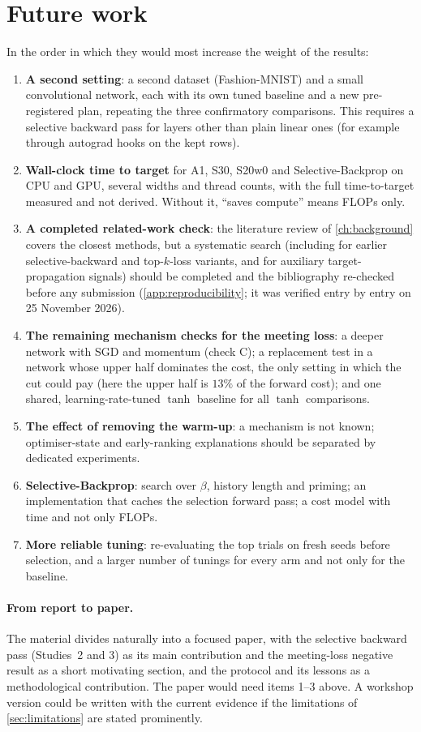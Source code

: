 \section{Future work}\label{sec:future}
In the order in which they would most increase the weight of the results:
\begin{enumerate}
\item \textbf{A second setting}: a second dataset (Fashion-MNIST) and a small convolutional network, each with its own tuned baseline and a new pre-registered plan, repeating the three confirmatory comparisons. This requires a selective backward pass for layers other than plain linear ones (for example through autograd hooks on the kept rows).
\item \textbf{Wall-clock time to target} for A1, S30, S20w0 and Selective-Backprop on CPU and GPU, several widths and thread counts, with the full time-to-target measured and not derived. Without it, ``saves compute'' means FLOPs only.
\item \textbf{A completed related-work check}: the literature review of \cref{ch:background} covers the closest methods, but a systematic search (including for earlier selective-backward and top-$k$-loss variants, and for auxiliary target-propagation signals) should be completed and the bibliography re-checked before any submission (\cref{app:reproducibility}; it was verified entry by entry on 25 November 2026).
\item \textbf{The remaining mechanism checks for the meeting loss}: a deeper network with SGD and momentum (check C); a replacement test in a network whose upper half dominates the cost, the only setting in which the cut could pay (here the upper half is $13\%$ of the forward cost); and one shared, learning-rate-tuned $\tanh$ baseline for all $\tanh$ comparisons.
\item \textbf{The effect of removing the warm-up}: a mechanism is not known; optimiser-state and early-ranking explanations should be separated by dedicated experiments.
\item \textbf{Selective-Backprop}: search over $\beta$, history length and priming; an implementation that caches the selection forward pass; a cost model with time and not only FLOPs.
\item \textbf{More reliable tuning}: re-evaluating the top trials on fresh seeds before selection, and a larger number of tunings for every arm and not only for the baseline.
\end{enumerate}

\paragraph{From report to paper.} The material divides naturally into a focused paper, with the selective backward pass (Studies~2 and 3) as its main contribution and the meeting-loss negative result as a short motivating section, and the protocol and its lessons as a methodological contribution. The paper would need items 1--3 above. A workshop version could be written with the current evidence if the limitations of \cref{sec:limitations} are stated prominently.
